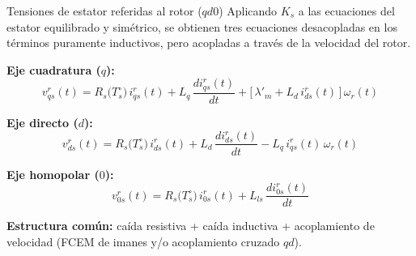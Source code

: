 \documentclass[aspectratio=169,t]{beamer}
\begin{document}
\begin{frame}{Tensiones de estator referidas al rotor ($qd0$)}
{\small\color{uncGray}Aplicando $K_s$ a las ecuaciones del estator equilibrado y simétrico, se obtienen tres ecuaciones desacopladas en los términos puramente inductivos, pero acopladas a través de la velocidad del rotor.}\par
\vspace{3mm}

\textbf{Eje cuadratura ($q$):}
\begin{equation*}
v^{r}_{qs}(t) = R_s\!\big(T_s^\circ\big)\,i^{r}_{qs}(t) + L_q\,\frac{d i^{r}_{qs}(t)}{dt} + \big[\,\lambda'_m + L_d\,i^{r}_{ds}(t)\,\big]\,\omega_r(t)
\end{equation*}

\textbf{Eje directo ($d$):}
\begin{equation*}
v^{r}_{ds}(t) = R_s\!\big(T_s^\circ\big)\,i^{r}_{ds}(t) + L_d\,\frac{d i^{r}_{ds}(t)}{dt} - L_q\,i^{r}_{qs}(t)\,\omega_r(t)
\end{equation*}

\textbf{Eje homopolar ($0$):}
\begin{equation*}
v^{r}_{0s}(t) = R_s\!\big(T_s^\circ\big)\,i^{r}_{0s}(t) + L_{ls}\,\frac{d i^{r}_{0s}(t)}{dt}
\end{equation*}

\vspace{1mm}
{\small \textbf{Estructura común:} caída resistiva + caída inductiva + acoplamiento de velocidad (FCEM de imanes y/o acoplamiento cruzado $qd$).}
\end{frame}
\end{document}

